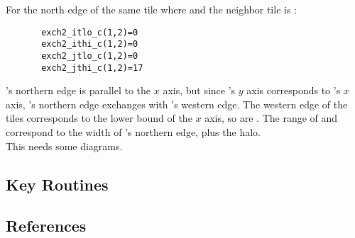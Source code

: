 For the north edge of the same tile  where  and 
the neighbor tile is :

\begin{verbatim}
       exch2_itlo_c(1,2)=0
       exch2_ithi_c(1,2)=0
       exch2_jtlo_c(1,2)=0
       exch2_jthi_c(1,2)=17
\end{verbatim}
 
's northern edge is parallel to the $x$ axis, but since
's $y$ axis corresponds to 's $x$ axis,
's northern edge exchanges with 's western edge.
The western edge of the tiles corresponds to the lower bound of the
$x$ axis, so   are . The
range of  and  correspond to the
width of 's northern edge, plus the halo. \\











This needs some diagrams. \\



\subsection{Key Routines}



\subsection{References}
